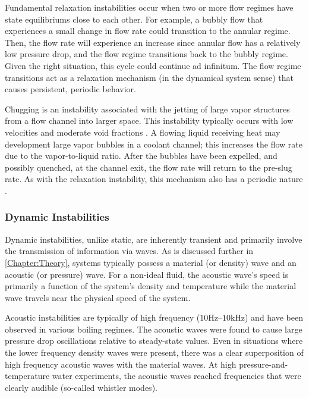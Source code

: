 Fundamental relaxation instabilities occur when two or more flow regimes have state equilibriums close to each other.
For example, a bubbly flow that experiences a small change in flow rate could transition to the annular regime.
Then, the flow rate will experience an increase since annular flow has a relatively low pressure drop, and the flow regime transitions back to the bubbly regime.
Given the right situation, this cycle could continue ad infinitum.
The flow regime transitions act as a relaxation mechanism (in the dynamical system sense) that causes persistent, periodic behavior.

Chugging is an instability associated with the jetting of large vapor structures from a flow channel into larger space.
This instability typically occurs with low velocities and moderate void fractions \cite{tong_boiling_1997}.
A flowing liquid receiving heat may development large vapor bubbles in a coolant channel; this increases the flow rate due to the vapor-to-liquid ratio.
After the bubbles have been expelled, and possibly quenched, at the channel exit, the flow rate will return to the pre-slug rate.
As with the relaxation instability, this mechanism also has a periodic nature \cite{aritomi_geysering_1993}.



\subsubsection{Dynamic Instabilities}
Dynamic instabilities, unlike static, are inherently transient and primarily involve the transmission of information via waves.
As is discussed further in \cref{Chapter:Theory}, \THs systems typically possess a material (or density) wave and an acoustic (or pressure) wave.
For a non-ideal fluid, the acoustic wave's speed is primarily a function of the system's density and temperature while the material wave travels near the physical speed of the system.

Acoustic instabilities are typically of high frequency ($10$Hz--$10$kHz) and have been observed in various boiling regimes.
The acoustic waves were found to cause large pressure drop oscillations relative to steady-state values.
Even in situations where the lower frequency density waves were present, there was a clear superposition of high frequency acoustic waves with the material waves.
At high pressure-and-temperature water experiments, the acoustic waves reached frequencies that were clearly audible (so-called whistler modes).


